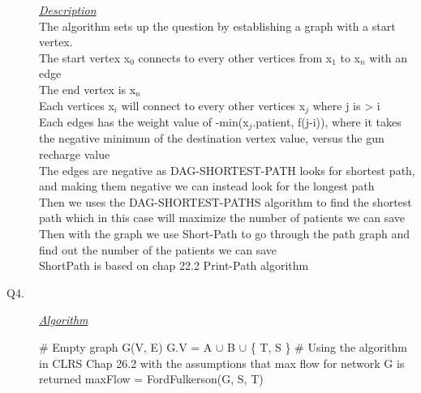 \documentclass[10pt]{csc_assignment}
\begin{document}
\begin{description}
\emph{\underline{Description}}\\
The algorithm sets up the question by establishing a graph with a start vertex. \\
The start vertex x$_{0}$ connects to every other vertices from x$_{1}$ to x$_{n}$ with an edge\\
The end vertex is x$_{n}$\\
Each vertices x$_{i}$ will connect to every other vertices  x$_{j}$ where j is > i \\ 
Each edges has the weight value of -min(x$_{j}$.patient, f(j-i)), where it takes the negative minimum of the destination vertex value, versus the gun recharge value \\
The edges are negative as DAG-SHORTEST-PATH looks for shortest path, and making them negative we can instead look for the longest path\\
 Then we uses the DAG-SHORTEST-PATHS algorithm to find the shortest path which in this case will maximize the number of patients we can save\\
Then with the graph we use Short-Path to go through the path graph and find out the number of the patients we can save\\
ShortPath is based on chap 22.2 Print-Path algorithm\\



\newpage
\item[Q4.]

\emph{\underline{Algorithm}}\\
\begin{algorithm}[H]
 \LinesNumbered 
 \# Empty graph\;
 G(V, E)\;
 G.V = A $\cup$ B $\cup$ \{ T, S \} \;
  \# Using the algorithm in CLRS Chap 26.2 with the assumptions that max flow for network G is returned\;
 maxFlow = FordFulkerson(G, S, T)\;
 

\end{algorithm}
\end{description}
\end{document}
